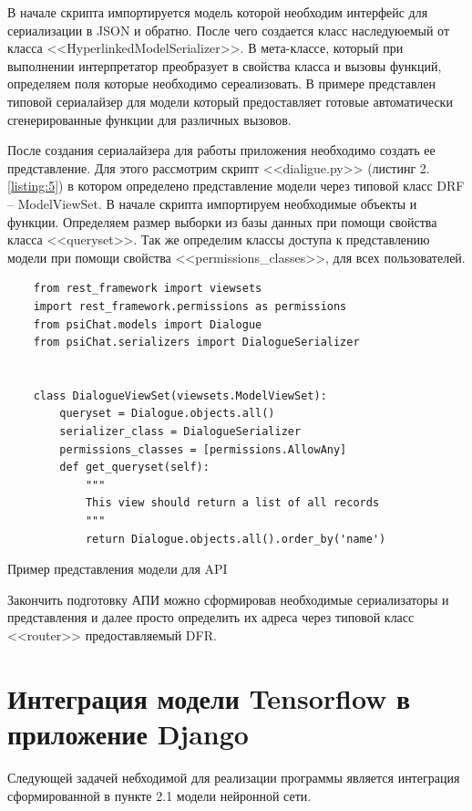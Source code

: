 В начале скрипта импортируется модель которой необходим интерфейс для сериализации в JSON и обратно. После чего создается класс наследуюемый от класса <<HyperlinkedModelSerializer>>. В мета-классе, который при выполнении интерпретатор преобразует в свойства класса и вызовы функций, определяем поля которые необходимо сереализовать. В примере представлен типовой сериалайзер для модели который предоставляет готовые автоматически сгенерированные функции для различных вызовов. 

После создания сериалайзера для работы приложения необходимо создать ее представление. Для этого рассмотрим скрипт <<dialigue.py>> (листинг 2.\ref{listing:5}) в котором определено представление модели через типовой класс DRF -- ModelViewSet. В начале скрипта импортируем необходимые объекты и функции. Определяем размер выборки из базы данных при помощи свойства класса <<queryset>>. Так же определим классы доступа к представлению модели при помощи свойства <<permissions\_classes>>, для всех пользователей. 

\begin{listing}[H]
\begin{verbatim}
    from rest_framework import viewsets
    import rest_framework.permissions as permissions
    from psiChat.models import Dialogue
    from psiChat.serializers import DialogueSerializer
    
    
    class DialogueViewSet(viewsets.ModelViewSet):
        queryset = Dialogue.objects.all()
        serializer_class = DialogueSerializer
        permissions_classes = [permissions.AllowAny]
        def get_queryset(self):
            """
            This view should return a list of all records
            """
            return Dialogue.objects.all().order_by('name')

\end{verbatim}
\caption{Пример представления модели для API}
\label{listing:5}
\end{listing}

Закончить подготовку АПИ можно сформировав необходимые сериализаторы и представления и далее просто определить их адреса через типовой класс <<router>> предоставляемый DFR. 

\section{Интеграция модели Tensorflow в приложение Django}
Следующей задачей небходимой для реализации программы является интеграция сформированной в пункте 2.1 модели нейронной сети. 

